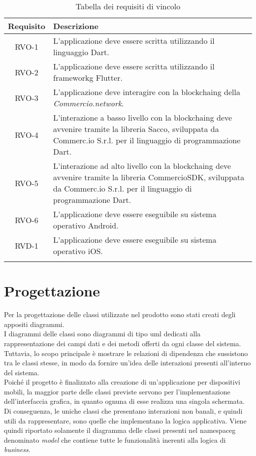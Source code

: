 \begin{longtable}{|c|p{10.5cm}|}
	\hline
	\rowcolor{gray}
	\textbf{Requisito} & \textbf{Descrizione} \\
	\hline
	RVO-1    & L'applicazione deve essere scritta utilizzando il linguaggio Dart. \\
	\hline
	RVO-2    & L'applicazione deve essere scritta utilizzando il \gls{frameworkg} Flutter. \\
	\hline
	RVO-3    & L'applicazione deve interagire con la \gls{blockchaing} della \textit{Commercio.network}. \\
	\hline
	RVO-4    & L'interazione a basso livello con la \gls{blockchaing} deve avvenire tramite la libreria Sacco, sviluppata da Commerc.io S.r.l. per il linguaggio di programmazione Dart. \\
	\hline
	RVO-5    & L'interazione ad alto livello con la \gls{blockchaing} deve avvenire tramite la libreria CommercioSDK, sviluppata da Commerc.io S.r.l. per il linguaggio di programmazione Dart. \\
	\hline
	RVO-6    & L'applicazione deve essere eseguibile su sistema operativo Android. \\
	\hline
	RVD-1    & L'applicazione deve essere eseguibile su sistema operativo iOS. \\
	\hline
	
	\caption{Tabella dei requisiti di vincolo}
	\label{tab:requisiti-vincolo}
\end{longtable}
	

\section{Progettazione}

Per la progettazione delle classi utilizzate nel prodotto sono stati creati degli appositi diagrammi.\\
I diagrammi delle classi sono diagrammi di tipo \gls{uml}\glsfirstoccur{} dedicati alla rappresentazione dei campi dati e dei metodi offerti da ogni classe del sistema. Tuttavia, lo scopo principale è mostrare le relazioni di dipendenza che sussistono tra le classi stesse, in modo da fornire un'idea delle interazioni presenti all'interno del sistema.\\
Poiché il progetto è finalizzato alla creazione di un'applicazione per dispositivi mobili, la maggior parte delle classi previste servono per l'implementazione dell'interfaccia grafica, in quanto ognuna di esse realizza una singola schermata. Di conseguenza, le uniche classi che presentano interazioni non banali, e quindi utili da rappresentare, sono quelle che implementano la logica applicativa. Viene quindi riportato solamente il diagramma delle classi presenti nel \gls{namespaceg}\glsfirstoccur{} denominato \textit{model} che contiene tutte le funzionalità inerenti alla logica di \textit{business}.


